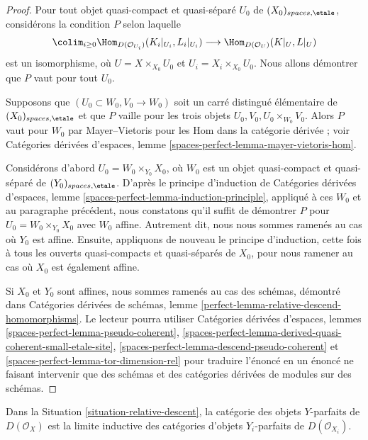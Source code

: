 \begin{proof}
Pour tout objet quasi-compact et quasi-séparé $U_0$ de
$(X_0)_{spaces, \etale}$, considérons la condition $P$ selon laquelle
$$
\colim_{i \geq 0} \Hom_{D(\mathcal{O}_{U_i})}(K_i|_{U_i}, L_i|_{U_i})
\longrightarrow
\Hom_{D(\mathcal{O}_U)}(K|_U, L|_U)
$$
est un isomorphisme, où $U = X \times_{X_0} U_0$ et
$U_i = X_i \times_{X_0} U_0$. Nous allons démontrer que $P$ vaut pour tout $U_0$.

\medskip\noindent
Supposons que $(U_0 \subset W_0, V_0 \to W_0)$ soit un carré
distingué élémentaire de $(X_0)_{spaces, \etale}$
et que $P$ vaille pour les trois objets $U_0, V_0, U_0 \times_{W_0} V_0$.
Alors $P$ vaut pour $W_0$ par Mayer--Vietoris
pour les Hom dans la catégorie dérivée ; voir Catégories dérivées d'espaces,
lemme \ref{spaces-perfect-lemma-mayer-vietoris-hom}.

\medskip\noindent
Considérons d'abord $U_0 = W_0 \times_{Y_0} X_0$, où $W_0$ est un objet
quasi-compact et quasi-séparé de $(Y_0)_{spaces, \etale}$.
D'après le principe d'induction de Catégories dérivées d'espaces,
lemme \ref{spaces-perfect-lemma-induction-principle},
appliqué à ces $W_0$ et au paragraphe précédent,
nous constatons qu'il suffit de démontrer
$P$ pour $U_0 = W_0 \times_{Y_0} X_0$ avec $W_0$ affine.
Autrement dit, nous nous sommes ramenés au cas où $Y_0$ est affine.
Ensuite, appliquons de nouveau le principe d'induction, cette fois à tous les
ouverts quasi-compacts et quasi-séparés de $X_0$, pour nous ramener au
cas où $X_0$ est également affine.

\medskip\noindent
Si $X_0$ et $Y_0$ sont affines, nous sommes ramenés au cas
des schémas, démontré dans
Catégories dérivées de schémas, lemme
\ref{perfect-lemma-relative-descend-homomorphisms}.
Le lecteur pourra utiliser
Catégories dérivées d'espaces, lemmes
\ref{spaces-perfect-lemma-pseudo-coherent},
\ref{spaces-perfect-lemma-derived-quasi-coherent-small-etale-site},
\ref{spaces-perfect-lemma-descend-pseudo-coherent} et
\ref{spaces-perfect-lemma-tor-dimension-rel}
pour traduire l'énoncé en un énoncé
ne faisant intervenir que des schémas et des catégories dérivées de modules sur des schémas.
\end{proof}

\begin{lemma}
\label{lemma-descend-relatively-perfect}
Dans la Situation \ref{situation-relative-descent}, la catégorie des
objets $Y$-parfaits de $D(\mathcal{O}_X)$ est la limite inductive des catégories
d'objets $Y_i$-parfaits de $D(\mathcal{O}_{X_i})$.
\end{lemma}


